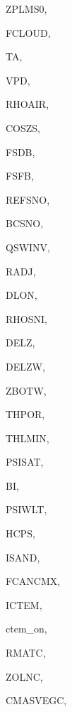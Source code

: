 {\begin{DoxyParamCaption}
\item[{real, dimension(ilg)}]{Z\+P\+L\+M\+S0, }
\item[{real, dimension(ilg)}]{F\+C\+L\+O\+U\+D, }
\item[{real, dimension    (ilg)}]{T\+A, }
\item[{real, dimension   (ilg)}]{V\+P\+D, }
\item[{real, dimension(ilg)}]{R\+H\+O\+A\+I\+R, }
\item[{real, dimension (ilg)}]{C\+O\+S\+Z\+S, }
\item[{real, dimension(ilg,nbs)}]{F\+S\+D\+B, }
\item[{real, dimension(ilg,nbs)}]{F\+S\+F\+B, }
\item[{real, dimension(ilg)}]{R\+E\+F\+S\+N\+O, }
\item[{real, dimension(ilg)}]{B\+C\+S\+N\+O, }
\item[{real, dimension(ilg)}]{Q\+S\+W\+I\+N\+V, }
\item[{real, dimension  (ilg)}]{R\+A\+D\+J, }
\item[{real, dimension  (ilg)}]{D\+L\+O\+N, }
\item[{real, dimension(ilg)}]{R\+H\+O\+S\+N\+I, }
\item[{real, dimension  (ig)}]{D\+E\+L\+Z, }
\item[{real, dimension (ilg,ig)}]{D\+E\+L\+Z\+W, }
\item[{real, dimension (ilg,ig)}]{Z\+B\+O\+T\+W, }
\item[{real, dimension (ilg,ig)}]{T\+H\+P\+O\+R, }
\item[{real, dimension(ilg,ig)}]{T\+H\+L\+M\+I\+N, }
\item[{real, dimension(ilg,ig)}]{P\+S\+I\+S\+A\+T, }
\item[{real, dimension    (ilg,ig)}]{B\+I, }
\item[{real, dimension(ilg,ig)}]{P\+S\+I\+W\+L\+T, }
\item[{real, dimension  (ilg,ig)}]{H\+C\+P\+S, }
\item[{integer, dimension (ilg,ig)}]{I\+S\+A\+N\+D, }
\item[{real, dimension(ilg,ictem)}]{F\+C\+A\+N\+C\+M\+X, }
\item[{integer}]{I\+C\+T\+E\+M, }
\item[{logical}]{ctem\+\_\+on, }
\item[{real, dimension(ilg,ic,ig)}]{R\+M\+A\+T\+C, }
\item[{real, dimension(ilg,ic)}]{Z\+O\+L\+N\+C, }
\item[{real, dimension(ilg,ic)}]{C\+M\+A\+S\+V\+E\+G\+C, }

\end{DoxyParamCaption}}
